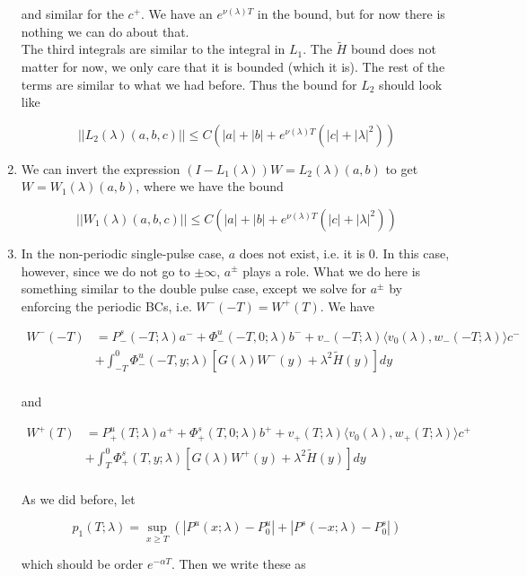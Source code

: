 \documentclass[12pt]{article}
\begin{document}
\begin{enumerate}
and similar for the $c^+$. We have an $e^{\nu(\lambda)T}$ in the bound, but for now there is nothing we can do about that.
\\

The third integrals are similar to the integral in $L_1$. The $\tilde{H}$ bound does not matter for now, we only care that it is bounded (which it is). The rest of the terms are similar to what we had before. Thus the bound for $L_2$ should look like

\[
||L_2(\lambda)(a,b,c)|| \leq C (|a| + |b| + e^{\nu(\lambda)T}(|c| + |\lambda|^2))
\]


\item We can invert the expression $(I - L_1(\lambda))W = L_2(\lambda)(a,b)$ to get $W = W_1(\lambda)(a,b)$, where we have the bound

\[
||W_1(\lambda)(a,b,c)|| \leq C (|a| + |b| + e^{\nu(\lambda)T}(|c| + |\lambda|^2))
\]

\item In the non-periodic single-pulse case, $a$ does not exist, i.e. it is 0. In this case, however, since we do not go to $\pm \infty$, $a^\pm$ plays a role. What we do here is something similar to the double pulse case, except we solve for $a^\pm$ by enforcing the periodic BCs, i.e. $W^-(-T) = W^+(T)$. We have 


\begin{align*}
W^-(-T) &= P^s_-(-T; \lambda)a^- + \Phi^u_-(-T, 0; \lambda)b^- + v_-(-T; \lambda) \langle v_0(\lambda), w_-(-T; \lambda) \rangle c^- \\
&+ \int_{-T}^0 \Phi^u_-(-T, y; \lambda)[ G(\lambda)W^-(y) + \lambda^2 \tilde{H}(y) ] dy \\
\end{align*}

and

\begin{align*}
W^+(T) &= P^u_+(T; \lambda)a^+ + \Phi^s_+(T, 0; \lambda)b^+ + v_+(T; \lambda) \langle v_0(\lambda), w_+(T; \lambda) \rangle c^+ \\
&+ \int_T^0 \Phi^s_+(T, y; \lambda) [ G(\lambda)W^+(y) + \lambda^2 \tilde{H}(y) ] dy \\
\end{align*}

As we did before, let

\[
p_1(T;\lambda) = \sup_{x \geq T} (|P^u(x;\lambda) - P_0^u| + |P^s(-x;\lambda) - P_0^s|)
\]

which should be order $e^{-\alpha T}$. Then we write these as


\end{enumerate}
\end{document}

